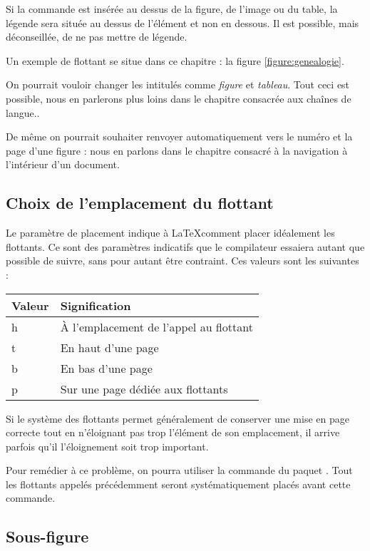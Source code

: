 Si la commande  est insérée au dessus de la figure, de l'image ou du table, la légende sera située au dessus de l'élément et non en dessous. Il est possible, mais déconseillée, de ne pas mettre de légende.

Un exemple de flottant se situe  dans ce chapitre : la figure \ref{figure:genealogie}.
\begin{attention}
	On pourrait vouloir changer les intitulés comme \emph{figure} et \emph{tableau}. Tout ceci est possible, nous en parlerons plus loins dans le chapitre consacrée aux chaînes de langue..
	
	De même on pourrait souhaiter renvoyer automatiquement vers le numéro et la page d'une figure : nous en parlons dans le chapitre consacré à la navigation à l'intérieur d'un document.
\end{attention}

\subsection{Choix de l'emplacement du flottant}

Le paramètre de placement indique à \LaTeX comment placer idéalement les flottants. Ce sont des paramètres indicatifs que le compilateur essaiera autant que possible de suivre, sans pour autant être contraint. Ces valeurs sont les suivantes :

\begin{longtable}{l|l}
	Valeur & Signification	\\
	\hline
	\endhead
	h 	& À l'emplacement de l'appel au flottant 	\\
	t 	& En haut d'une page				\\
	b 	& En bas d'une page				\\
	p 	& Sur une page dédiée aux flottants		\\
\end{longtable}


Si le système des flottants permet généralement de conserver une mise en page correcte tout en n'éloignant pas trop l'élément de son emplacement, il arrive parfois qu'il l'éloignement soit trop important.

Pour remédier à ce problème, on pourra utiliser la commande  du paquet . 
Tout les flottants appelés précédemment seront systématiquement placés avant cette commande.

\subsection{Sous-figure}

